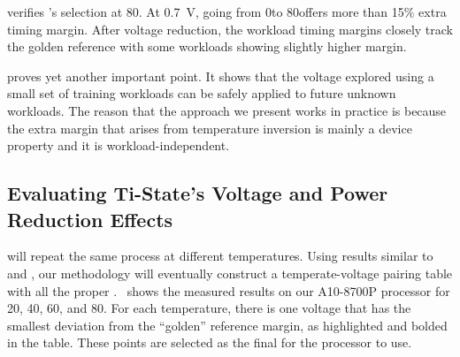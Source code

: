  verifies 's \tistate selection at 80\C. At 0.7~V, going from 0\C to 80\C offers more than 15\% extra timing margin. After voltage reduction, the workload timing margins closely track the golden reference with some workloads showing slightly higher margin.

 proves yet another important point. It shows that the voltage explored using a small set of training workloads can be safely applied to future unknown workloads. The reason that the approach we present works in practice is because the extra margin that arises from temperature inversion is mainly a device property and it is workload-independent.

\subsection{Evaluating Ti-State's Voltage and Power Reduction Effects}
\label{sec:temperature:temperature:table}

 will repeat the same process at different temperatures. Using results similar to~ and , our methodology will eventually construct a temperate-voltage pairing table with all the proper \tistates.~ shows the measured results on our A10-8700P processor for 20\C, 40\C, 60\C, and 80\C. For each temperature, there is one voltage that has the smallest deviation from the ``golden'' reference margin, as highlighted and bolded in the table. These points are selected as the final \tistates for the processor to use.

\begin{table}
\centering
{}
\vspace{0.2cm}
\caption{PSM error compared to the reference setting for different $<temperature, voltage>$ configurations.}
\label{table:explore-err} 
\end{table}

